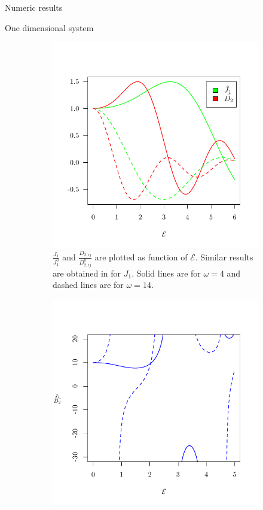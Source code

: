 \begin{section}{Numeric results}
\begin{subsection}{One dimensional system}
\begin{figure}
\centering
\begin{subfigure}{.5\textwidth}
  \includegraphics[width=1\linewidth]{Figures/NNvsNNN1.pdf}
  \caption{$\frac{J_{1}}{J_{1}^0}$ and $\frac{D_{2,ij}}{D_{2,ij}^0}$ are plotted as function of $\mathcal{E}$. Similar results are obtained in \cite{Mentink2015} for $J_{1}$. Solid lines are for $\omega = 4$ and dashed lines are for $\omega = 14$.}
  \label{Fig3.1:NNvsNNN}
\end{subfigure}%
\hspace*{\fill}
\begin{subfigure}{.5\textwidth}
  \includegraphics[width=1\linewidth]{Figures/ratio.pdf}

\end{subfigure}
\end{figure}
\end{subsection}
\end{section}
